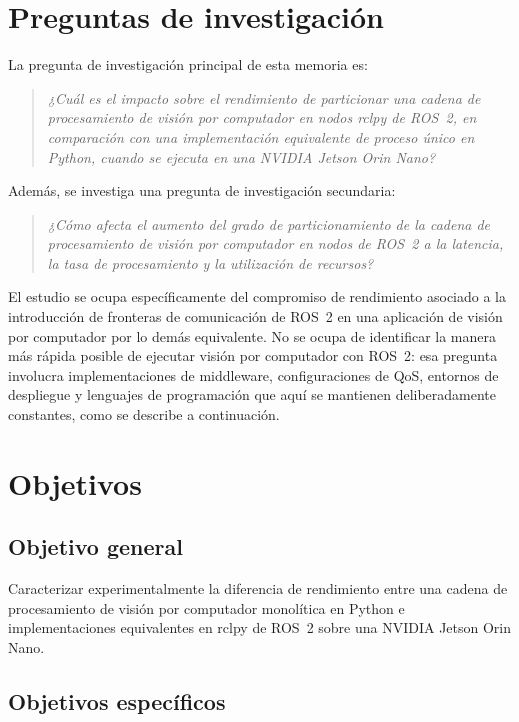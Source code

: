 \section{Preguntas de investigación}
\label{sec:research-questions}

La pregunta de investigación principal de esta memoria es:

\begin{quote}
\emph{¿Cuál es el impacto sobre el rendimiento de particionar una cadena de
procesamiento de visión por computador en nodos rclpy de ROS~2, en
comparación con una implementación equivalente de proceso único en Python,
cuando se ejecuta en una NVIDIA Jetson Orin Nano?}
\end{quote}

Además, se investiga una pregunta de investigación secundaria:

\begin{quote}
\emph{¿Cómo afecta el aumento del grado de particionamiento de la cadena de
procesamiento de visión por computador en nodos de ROS~2 a la latencia, la
tasa de procesamiento y la utilización de recursos?}
\end{quote}

El estudio se ocupa específicamente del compromiso de rendimiento asociado
a la introducción de fronteras de comunicación de ROS~2 en una aplicación
de visión por computador por lo demás equivalente. No se ocupa de identificar
la manera más rápida posible de ejecutar visión por computador con ROS~2:
esa pregunta involucra implementaciones de middleware, configuraciones de
QoS, entornos de despliegue y lenguajes de programación que aquí se
mantienen deliberadamente constantes, como se describe a continuación.

\section{Objetivos}
\label{sec:objectives}

\subsection{Objetivo general}

Caracterizar experimentalmente la diferencia de rendimiento entre una cadena
de procesamiento de visión por computador monolítica en Python e
implementaciones equivalentes en rclpy de ROS~2 sobre una NVIDIA Jetson
Orin Nano.

\subsection{Objetivos específicos}

